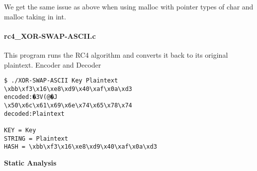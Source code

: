 We get the same issue as above when using malloc with pointer types of
char and malloc taking in int.

\hypertarget{rc4_xor-swap-asciic}{%
\paragraph{rc4\_XOR-SWAP-ASCII.c}\label{rc4_xor-swap-asciic}}

This program runs the RC4 algorithm and converts it back to its original
plaintext. Encoder and Decoder

\begin{verbatim}
$ ./XOR-SWAP-ASCII Key Plaintext
\xbb\xf3\x16\xe8\xd9\x40\xaf\x0a\xd3
encoded:�3V(@�J
\x50\x6c\x61\x69\x6e\x74\x65\x78\x74
decoded:Plaintext

KEY = Key
STRING = Plaintext
HASH = \xbb\xf3\x16\xe8\xd9\x40\xaf\x0a\xd3

\end{verbatim}

\textbf{Static Analysis}


